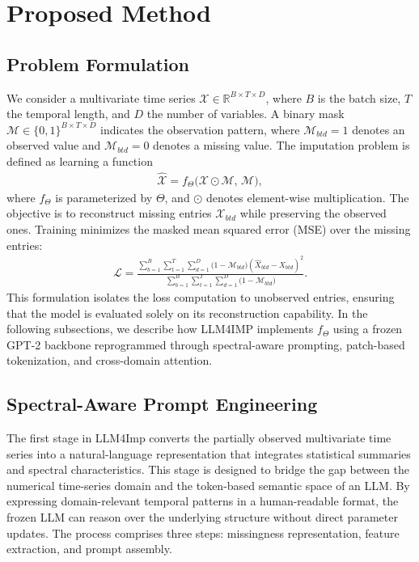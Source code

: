\documentclass[conference]{IEEEtran}
\begin{document}

\section{Proposed Method}
\label{sec:proposed-method}
\subsection{Problem Formulation}
\label{subsec:problem-formulation}
We consider a multivariate time series
$\mathcal{X} \in \mathbb{R}^{B \times T \times D}$,
where $B$ is the batch size, $T$ the temporal length, and $D$ the number of variables.
A binary mask
$\mathcal{M} \in \{0,1\}^{B \times T \times D}$
indicates the observation pattern, where $\mathcal{M}_{btd} = 1$ denotes an observed value and
$\mathcal{M}_{btd} = 0$ denotes a missing value.
The imputation problem is defined as learning a function
\begin{align}
\hat{\mathcal{X}} = f_{\Theta}\big(\mathcal{X} \odot \mathcal{M},\, \mathcal{M}\big),
\label{eq:imputation_function}
\end{align}
where $f_{\Theta}$ is parameterized by $\Theta$, and $\odot$ denotes element-wise multiplication.
The objective is to reconstruct missing entries $\mathcal{X}_{btd}$ while preserving the observed ones.
Training minimizes the masked mean squared error (MSE) over the missing entries:
\begin{align}
\mathcal{L} =
\frac{\sum\limits_{b=1}^{B} \sum\limits_{t=1}^{T} \sum\limits_{d=1}^{D}
\big(1 - \mathcal{M}_{btd}\big)
\left(\hat{X}_{btd} - X_{btd}\right)^{2}}
{\sum\limits_{b=1}^{B} \sum\limits_{t=1}^{T} \sum\limits_{d=1}^{D}
\big(1 - \mathcal{M}_{btd}\big)}.
\label{eq:loss}
\end{align}
This formulation isolates the loss computation to unobserved entries, ensuring that the model is evaluated solely on its reconstruction capability.
In the following subsections, we describe how LLM4IMP implements $f_{\Theta}$ using a frozen GPT-2 backbone reprogrammed through spectral-aware prompting, patch-based tokenization, and cross-domain attention.

\subsection{Spectral-Aware Prompt Engineering}
\label{subsec:spectral-prompt}

The first stage in LLM4Imp converts the partially observed multivariate time series into a natural-language representation that integrates statistical summaries and spectral characteristics. This stage is designed to bridge the gap between the numerical time-series domain and the token-based semantic space of an LLM. By expressing domain-relevant temporal patterns in a human-readable format, the frozen LLM can reason over the underlying structure without direct parameter updates. The process comprises three steps: missingness representation, feature extraction, and prompt assembly.
\end{document}
